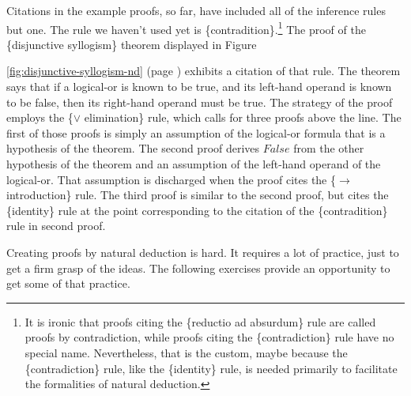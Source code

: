 {Citations in the example proofs, so far, have included all of the inference rules
but one. The rule we haven't used yet is \{contradition\}.\footnote{It
is ironic that proofs citing the \{reductio ad absurdum\} rule
are called proofs by contradiction, while proofs citing the
\{contradiction\} rule have no special name.
Nevertheless, that is the custom, maybe because
the \{contradiction\} rule, like the \{identity\} rule,
is needed primarily to facilitate the formalities of
natural deduction.}
The proof of the \{disjunctive syllogism\} theorem displayed in
Figure~{\ref{fig:disjunctive-syllogism-nd} (page \pageref{fig:disjunctive-syllogism-nd})
exhibits a citation of that rule.
The theorem says that if a logical-or is known to be true,
and its left-hand operand is known to be false,
then its right-hand operand must be true.
The strategy of the proof employs the \{$\vee$ elimination\} rule,
which calls for three proofs above the line.
The first of those proofs is simply an assumption of
the logical-or formula that is a hypothesis of the theorem.
The second proof derives $False$ from the other hypothesis
of the theorem and an assumption of the left-hand operand
of the logical-or. That assumption is discharged when
the proof cites the \{$\rightarrow$ introduction\} rule.
The third proof is similar to the second proof,
but cites the \{identity\} rule at the point
corresponding to the citation of the \{contradition\} rule in second proof.

Creating proofs by
natural deduction is hard.
It requires a lot of practice, just to get
a firm grasp of the ideas.
The following exercises provide an opportunity
to get some of that practice.

}}

